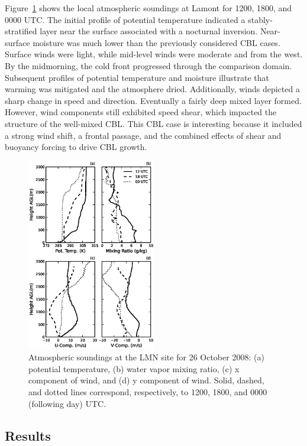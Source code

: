 Figure~\ref{figure419} shows the local atmospheric soundings at Lamont for 1200, 1800, and 0000 UTC. The initial profile of potential temperature indicated a stably-stratified layer near the surface associated with a nocturnal inversion. Near-surface moisture was much lower than the previously considered CBL cases. Surface winds were light, while mid-level winds were moderate and from the west. By the midmorning, the cold front progressed through the comparison domain. Subsequent profiles of potential temperature and moisture illustrate that warming was mitigated and the atmosphere dried. Additionally, winds depicted a sharp change in speed and direction. Eventually a fairly deep mixed layer formed. However, wind components still exhibited speed shear, which impacted the structure of the well-mixed CBL. This CBL case is interesting because it included a strong wind shift, a frontal passage, and the combined effects of shear and buoyancy forcing to drive CBL growth. 


\begin{figure}[H]
\begin{center}
\includegraphics[width=0.5\textwidth]{figures/chapter4/20081026_lmnsounding}
\end{center}
\caption{Atmospheric soundings at the LMN site for 26 October 2008: (a) potential temperature, (b) water vapor mixing ratio, (c) x component of wind, and (d) y component of wind. Solid, dashed, and dotted lines correspond, respectively, to 1200, 1800, and 0000 (following day) UTC.}
\label{figure419}
\end{figure}


\subsection{Results}
\label{res-452}

